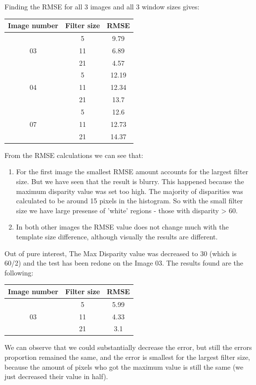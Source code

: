 \documentclass[a4paper]{iacas}
\begin{document}
Finding the RMSE for all 3 images and all 3 window sizes gives:


\begin{table}[]
\begin{tabular}{|c|c|c|}
\hline
Image number        & Filter size & RMSE  \\ \hline
\multirow{3}{*}{03} & 5           & 9.79  \\ \cline{2-3} 
                    & 11          & 6.89  \\ \cline{2-3} 
                    & 21          & 4.57  \\ \hline
\multirow{3}{*}{04} & 5           & 12.19 \\ \cline{2-3} 
                    & 11          & 12.34 \\ \cline{2-3} 
                    & 21          & 13.7  \\ \hline
\multirow{3}{*}{07} & 5           & 12.6  \\ \cline{2-3} 
                    & 11          & 12.73 \\ \cline{2-3} 
                    & 21          & 14.37 \\ \hline
\end{tabular}
\end{table}
From the RMSE calculations we can see that:




\begin{enumerate}
\item For the first image the smallest RMSE amount accounts for the largest filter size. But we have seen that the result is blurry. This happened because the maximum disparity value was set too high. The majority of disparities was calculated to be around 15 pixels in the histogram. So with the small filter size we have large presense of 'white' regions - those with disparity > 60.
\item In both other images the RMSE value does not change much with the template size difference, although visually the results are different.
\end{enumerate}

Out of pure interest, The Max Disparity value was decreased to 30 (which is 60/2) and the test has been redone on the Image 03. The results found are the following:

\begin{table}[]
\begin{tabular}{|c|c|c|}
\hline
Image number        & Filter size & RMSE  \\ \hline
\multirow{3}{*}{03} & 5           & 5.99  \\ \cline{2-3} 
                    & 11          & 4.33  \\ \cline{2-3} 
                    & 21          & 3.1  \\ \hline
\end{tabular}
\end{table}
We can observe that we could substantially decrease the error, but still the errors proportion remained the same, and the error is smallest for the largest filter size, because the amount of pixels who got the maximum value is still the same (we just decreased their value in half).
\end{document}
